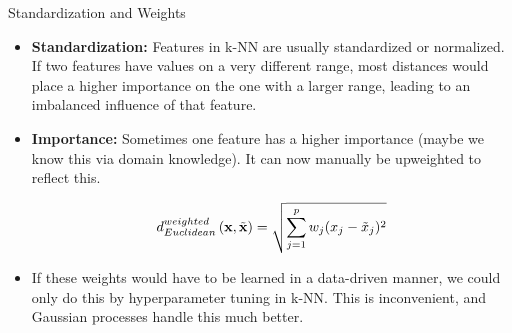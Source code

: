\documentclass[11pt,compress,t,notes=noshow, xcolor=table]{beamer}
\begin{document}
\begin{vbframe}{Standardization and Weights}


\begin{itemize}
  \item \textbf{Standardization:} Features in k-NN are usually standardized or normalized. If two features have values on a very different range, most distances would place a higher importance on the one with a larger range, leading to an imbalanced influence of that feature.
  \item \textbf{Importance:} Sometimes one feature has a higher importance (maybe we know this via domain knowledge). It can now manually be upweighted to reflect this.

$$d^{weighted}_{Euclidean}\left(\mathbf{x}, \tilde{\mathbf{x}}\right) = \sqrt{\sum\limits_{j=1}^p w_{j}(x_j- \tilde{x}_j)^2}$$

  \item If these weights would have to be learned in a data-driven manner,
    we could only do this by hyperparameter tuning in k-NN. This is inconvenient,
    and Gaussian processes handle this much better.
\end{itemize}

\end{vbframe}
\end{document}
